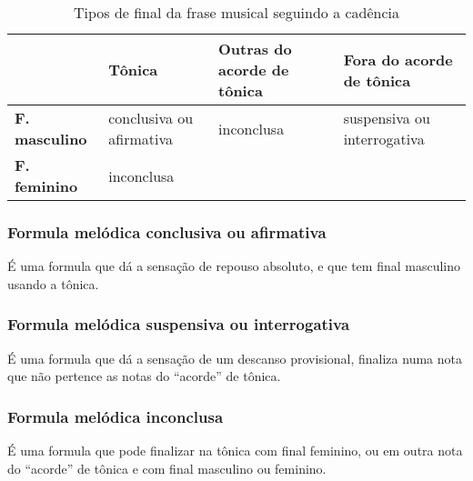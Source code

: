 \begin{table}[!h]
  \centering
  \begin{tabular}{|l|p{3cm}|p{2.5cm}|p{3.5cm}|}
  \hline
  ~                      & \textbf{Tônica} & \textbf{Outras do acorde de tônica} & \textbf{Fora do acorde de tônica} \\ \hline \hline
  \textbf{F. masculino}  & conclusiva ou afirmativa  & inconclusa & suspensiva ou interrogativa  \\ \cline{1-2}
  \textbf{F. feminino}   & inconclusa                & ~ & ~   \\ \hline
  \end{tabular}  
  \caption{Tipos de final da frase musical seguindo a cadência}
  \label{tab:tablefinaltipo}
\end{table}

\subsubsection{Formula melódica conclusiva ou afirmativa}
É uma formula que dá a sensação de repouso absoluto,
e que tem final masculino  usando a tônica.

\subsubsection{Formula melódica suspensiva ou interrogativa}
É uma formula que dá a sensação de um descanso provisional,
finaliza numa nota que não pertence as notas do ``acorde'' de tônica. 

\subsubsection{Formula melódica inconclusa}
É uma formula que pode finalizar na tônica com final feminino, ou
em outra nota do ``acorde'' de tônica e com final masculino ou feminino.
